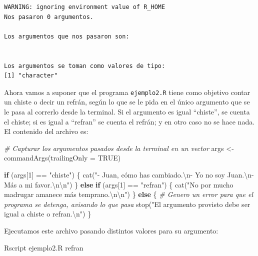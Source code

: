 \documentclass[
]{book}
\newenvironment{Shaded}{\begin{snugshade}}{\end{snugshade}}
\newcommand{\AttributeTok}[1]{\textcolor[rgb]{0.77,0.63,0.00}{#1}}
\newcommand{\CommentTok}[1]{\textcolor[rgb]{0.56,0.35,0.01}{\textit{#1}}}
\newcommand{\ConstantTok}[1]{\textcolor[rgb]{0.00,0.00,0.00}{#1}}
\newcommand{\ControlFlowTok}[1]{\textcolor[rgb]{0.13,0.29,0.53}{\textbf{#1}}}
\newcommand{\DecValTok}[1]{\textcolor[rgb]{0.00,0.00,0.81}{#1}}
\newcommand{\ExtensionTok}[1]{#1}
\newcommand{\FunctionTok}[1]{\textcolor[rgb]{0.00,0.00,0.00}{#1}}
\newcommand{\NormalTok}[1]{#1}
\newcommand{\OtherTok}[1]{\textcolor[rgb]{0.56,0.35,0.01}{#1}}
\newcommand{\SpecialCharTok}[1]{\textcolor[rgb]{0.00,0.00,0.00}{#1}}
\newcommand{\StringTok}[1]{\textcolor[rgb]{0.31,0.60,0.02}{#1}}
\begin{document}
\begin{verbatim}
WARNING: ignoring environment value of R_HOME
Nos pasaron 0 argumentos.

Los argumentos que nos pasaron son:
 

Los argumentos se toman como valores de tipo:
[1] "character"
\end{verbatim}

Ahora vamos a suponer que el programa \texttt{ejemplo2.R} tiene como objetivo contar un chiste o decir un refrán, según lo que se le pida en el único argumento que se le pasa al correrlo desde la terminal. Si el argumento es igual ``chiste'', se cuenta el chiste; si es igual a ``refran'' se cuenta el refrán; y en otro caso no se hace nada. El contenido del archivo es:

\begin{Shaded}
\begin{Highlighting}[]
\CommentTok{\# Capturar los argumentos pasados desde la terminal en un vector}
\NormalTok{args }\OtherTok{\textless{}{-}} \FunctionTok{commandArgs}\NormalTok{(}\AttributeTok{trailingOnly =} \ConstantTok{TRUE}\NormalTok{)}

\ControlFlowTok{if}\NormalTok{ (args[}\DecValTok{1}\NormalTok{] }\SpecialCharTok{==} \StringTok{"chiste"}\NormalTok{) \{}
    \FunctionTok{cat}\NormalTok{(}\StringTok{"{-} Juan, cómo has cambiado.}\SpecialCharTok{\textbackslash{}n}\StringTok{{-} Yo no soy Juan.}\SpecialCharTok{\textbackslash{}n}\StringTok{{-} Más a mi favor.}\SpecialCharTok{\textbackslash{}n\textbackslash{}n}\StringTok{"}\NormalTok{)}
\NormalTok{\} }\ControlFlowTok{else} \ControlFlowTok{if}\NormalTok{ (args[}\DecValTok{1}\NormalTok{] }\SpecialCharTok{==} \StringTok{"refran"}\NormalTok{) \{}
    \FunctionTok{cat}\NormalTok{(}\StringTok{"No por mucho madrugar amanece más temprano.}\SpecialCharTok{\textbackslash{}n\textbackslash{}n}\StringTok{"}\NormalTok{)}
\NormalTok{\} }\ControlFlowTok{else}\NormalTok{ \{}
    \CommentTok{\# Genero un error para que el programa se detenga, avisando lo que pasa}
    \FunctionTok{stop}\NormalTok{(}\StringTok{"El argumento provisto debe ser igual a chiste o refran.}\SpecialCharTok{\textbackslash{}n}\StringTok{"}\NormalTok{)}
\NormalTok{\}}
\end{Highlighting}
\end{Shaded}

Ejecutamos este archivo pasando distintos valores para su argumento:

\begin{Shaded}
\begin{Highlighting}[]
\ExtensionTok{Rscript}\NormalTok{ ejemplo2.R refran}
\end{Highlighting}
\end{Shaded}
\end{document}
